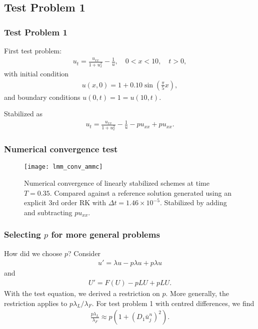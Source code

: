 \documentclass[hyperref={pdfpagelabels=false}]{beamer}
\begin{document}
\subsection{Test Problem 1} 
\begin{frame}
	\frametitle{Test Problem 1} 
First test problem: 
	\begin{align*}
		u_t = \frac{u_{xx}}{1 + u_x^2} - \frac{1}{u}, 
		\quad 0 < x < 10,\quad t > 0, 
	\end{align*}
with initial condition 
	\begin{align*}
		u(x,0) = 1 + 0.10\sin\left(\frac{\pi}{5}x \right),
	\end{align*}
and boundary conditions $u(0,t) = 1 = u(10,t)$.

Stabilized as 
\begin{align*}
u_t = \frac{u_{xx}}{1 + u_x^2} - \frac{1}{u} - pu_{xx} + pu_{xx}.
\end{align*}
\end{frame}

\begin{frame}
	\frametitle{Numerical convergence test}
	\begin{figure}[t]
		\centering
		\texttt{[image: lmm\_conv\_ammc]}
		\caption{Numerical convergence of linearly stabilized schemes at time $T=0.35$. Compared against a reference solution generated using an explicit 3rd order RK with $\Delta t = 1.46\times 10^{-5}$. Stabilized by adding and subtracting $pu_{xx}$.}
	\end{figure}
\end{frame}

\begin{frame}
	\frametitle{Selecting $p$ for more general problems}
How did we choose $p$? Consider 
	\begin{align*}
		u' = \lambda u - p\lambda u + p\lambda u
	\end{align*}
and 
	\begin{align*}
		U' = F(U) - pLU + pLU.
	\end{align*}
With the test equation, we derived a restriction on $p$. More generally, the restriction applies to $p\lambda_L / \lambda_F$. For test problem 1 with centred differences, we find 
	\begin{align*}
		\frac{p\lambda_L}{\lambda_F} 
		\approx p(1 + (D_1 \bar u^n_j)^2).
	\end{align*}
\end{frame}
\end{document}
